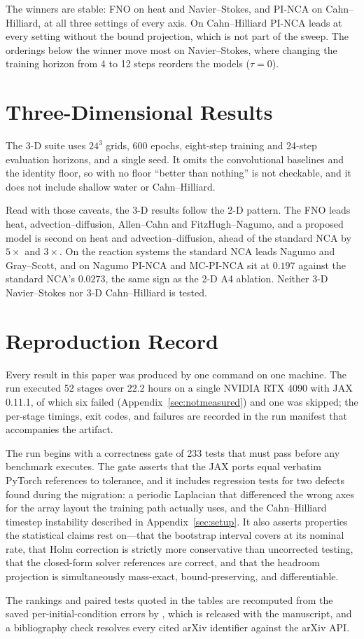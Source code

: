 The winners are stable: FNO on heat and Navier--Stokes, and PI-NCA on Cahn--Hilliard, at
all three settings of every axis. On Cahn--Hilliard PI-NCA leads at every setting without
the bound projection, which is not part of the sweep. The orderings below the winner move
most on Navier--Stokes, where changing the training horizon from 4 to 12 steps reorders
the models ($\tau=0$).

\section{Three-Dimensional Results}
\label{sec:three-details}

The 3-D suite uses $24^3$ grids, 600 epochs, eight-step training and 24-step evaluation
horizons, and a single seed. It omits the convolutional baselines and the identity floor,
so with no floor ``better than nothing'' is not checkable, and it does not include shallow
water or Cahn--Hilliard.

Read with those caveats, the 3-D results follow the 2-D pattern. The FNO leads heat,
advection--diffusion, Allen--Cahn and FitzHugh--Nagumo, and a proposed model is second on
heat and advection--diffusion, ahead of the standard NCA by $5\times$ and $3\times$. On the
reaction systems the standard NCA leads Nagumo and Gray--Scott, and on Nagumo PI-NCA and
MC-PI-NCA sit at $0.197$ against the standard NCA's $0.0273$, the same sign as the 2-D A4
ablation. Neither 3-D Navier--Stokes nor 3-D Cahn--Hilliard is tested.

\section{Reproduction Record}
\label{sec:repro}
Every result in this paper was produced by one command on one machine. The run executed
52 stages over 22.2 hours on a single NVIDIA RTX 4090 with JAX 0.11.1, of which six
failed (Appendix~\ref{sec:notmeasured}) and one was skipped; the per-stage timings, exit
codes, and failures are recorded in the run manifest that accompanies the artifact.

The run begins with a correctness gate of 233 tests that must pass before any benchmark
executes. The gate asserts that the JAX ports equal verbatim PyTorch references to
tolerance, and it includes regression tests for two defects found during the migration:
a periodic Laplacian that differenced the wrong axes for the array layout the training
path actually uses, and the Cahn--Hilliard timestep instability described in
Appendix~\ref{sec:setup}. It also asserts properties the statistical claims rest on---that
the bootstrap interval covers at its nominal rate, that Holm correction is strictly more
conservative than uncorrected testing, that the closed-form solver references are correct,
and that the headroom projection is simultaneously mass-exact, bound-preserving, and
differentiable.

The rankings and paired tests quoted in the tables are recomputed from the saved
per-initial-condition errors by , which is released with the
manuscript, and a bibliography check resolves every cited arXiv identifier against the
arXiv API.
